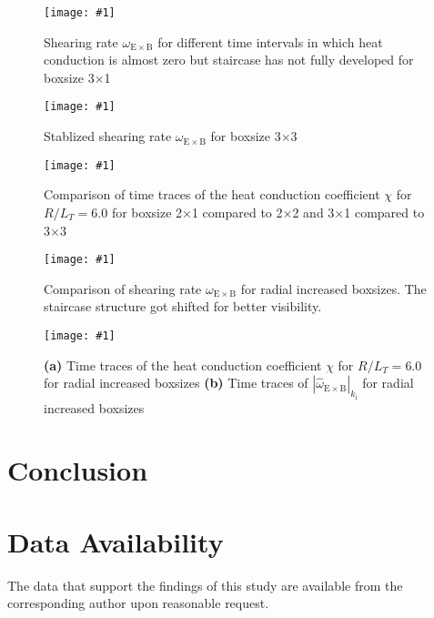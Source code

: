 \documentclass[aip, amsmath, amssymb, reprint, twocolumn]{revtex4-1}
\newcommand{\includegraphicsOneCol}[3]{
	\begin{figure}[ht]
		\texttt{[image: \#1]}
		\caption{#2}
  	\end{figure}
	\label{#3}
  	\increasecounter{fig}{1}
}
\newcommand{\includegraphicsTwoCol}[3]{
	\begin{figure*}
    	\texttt{[image: \#1]}
		\caption{#2}
	\end{figure*}
	\label{#3}
	\increasecounter{fig}{2}
}
\begin{document}
\includegraphicsOneCol{S6_rlt6.0/boxsize3x1/Ns16/Nvpar48/Nmu9/S6_rlt6.0_boxsize3x1_Ns16_Nvpar48_Nmu9_wexb_selection.pdf}{
	Shearing rate $\omega_{\mathrm{E \times B}}$ for different time intervals in which heat conduction is almost zero but staircase has not fully developed for boxsize 3$\times$1
}{fig:wexb-3x1-selection}

\includegraphicsOneCol{S6_rlt6.0/boxsize3x3/Ns16/Nvpar48/Nmu9/S6_rlt6.0_boxsize3x3_Ns16_Nvpar48_Nmu9_wexb_selection.pdf}{
	Stablized shearing rate $\omega_{\mathrm{E \times B}}$ for boxsize 3$\times$3
}{fig:wexb-3x3-stable}

\includegraphicsTwoCol{Comparison/Boxsize/S6_rlt6.0_boxsize2x1-2-3x1-3_Ns16_Nvpar48_Nmu9_eflux_comparison.pdf}{
	Comparison of time traces of the heat conduction coefficient $\chi$ for $R/L_T = 6.0$ for boxsize 2$\times$1 compared to 2$\times$2 and 3$\times$1 compared to 3$\times$3
}{fig:eflux-2x1-2-3x1-3-comparison}

\includegraphicsTwoCol{Comparison/Boxsize/S6_rlt6.0_boxsize1-2-3-4x1_Ns16_Nvpar48_Nmu9_wexb_comparison.pdf}{
	Comparison of shearing rate $\omega_{\mathrm{E \times B}}$ for radial increased boxsizes. The staircase structure got 
	shifted for better visibility.
}{fig:wexb-1-2-3-4x1-stable-comparison}

\includegraphicsTwoCol{Comparison/Boxsize/S6_rlt6.0_boxsize1-2-3-4x1_Ns16_Nvpar48_Nmu9_comparison.pdf}{
	\textbf{(a)} Time traces of the heat conduction coefficient $\chi$ for $R/L_T = 6.0$ for radial increased boxsizes \linebreak
	\textbf{(b)} Time traces of $|\hat{\omega}_{\mathrm{E\times B}}|_{k_\mathrm{i}}$ for radial increased boxsizes
}{fig:wexb-eflux-1-2-3-4x1-comparison}


\section{Conclusion}
\label{sec:conclusion}

\section*{Data Availability}
The data that support the findings of this study are available from the corresponding author upon reasonable request.


\wordcountmessage


\end{document}
